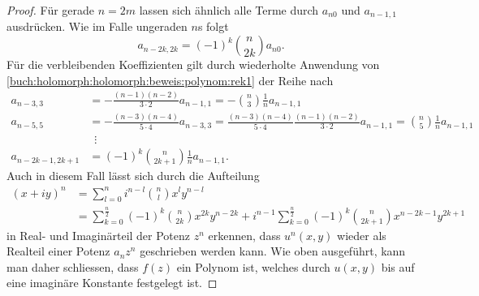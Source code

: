 \begin{proof}
Für gerade $n=2m$ lassen sich ähnlich alle Terme durch $a_{n0}$ und
$a_{n-1,1}$ ausdrücken.
Wie im Falle ungeraden $n$s folgt
\[
a_{n-2k,2k}
=
(-1)^k
\binom{n}{2k}
a_{n0}.
\]
Für die verbleibenden Koeffizienten gilt durch wiederholte Anwendung
von \eqref{buch:holomorph:holomorph:beweis:polynom:rek1}
der Reihe nach
\begin{align*}
a_{n-3,3}
&=
-
\frac{
(n-1)(n-2)
}{
3\cdot 2
}
a_{n-1,1}
=
-
\binom{n}{3} \frac{1}{n} a_{n-1,1}
\\
a_{n-5,5}
&=
-
\frac{
(n-3)(n-4)
}{
5\cdot 4
}
a_{n-3,3}
=
\frac{
(n-3)(n-4)
}{
5\cdot 4
}
\frac{
(n-1)(n-2)
}{
3\cdot 2
}
a_{n-1,1}
=
\binom{n}{5}\frac{1}{n}a_{n-1,1}
\\
&\phantom{0}\vdots
\\
a_{n-2k-1,2k+1}
&=
(-1)^k
\binom{n}{2k+1}\frac{1}{n}a_{n-1,1}.
\end{align*}
Auch in diesem Fall lässt sich durch die Aufteilung
\begin{align*}
(x+iy)^n
&=
\sum_{l=0}^n i^{n-l} \binom{n}{l} x^ly^{n-l}
\\
&=
\sum_{k=0}^{\frac{n}2} (-1)^k\binom{n}{2k} x^{2k}y^{n-2k}
+
i^{n-1}
\sum_{k=0}^{\frac{n}2} (-1)^k\binom{n}{2k+1} x^{n-2k-1}y^{2k+1}
\end{align*}
in Real- und Imaginärteil der Potenz $z^n$ erkennen, dass 
$u^n(x,y)$ wieder als Realteil einer Potenz $a_nz^n$ geschrieben
werden kann.
Wie oben ausgeführt, kann man daher schliessen, dass $f(z)$ ein
Polynom ist, welches durch $u(x,y)$ bis auf eine imaginäre Konstante
festgelegt ist.
\end{proof}

